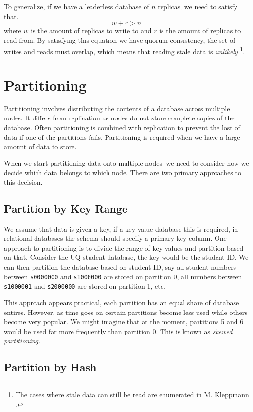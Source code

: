 To generalize, if we have a leaderless database of $n$ replicas,
we need to satisfy that,
$$
w + r > n
$$
where $w$ is the amount of replicas to write to and $r$ is the amount of replicas to read from.
By satisfying this equation we have quorum consistency,
the set of writes and reads must overlap,
which means that reading stale data is \textsl{unlikely}%
\footnote{The cases where stale data can still be read are enumerated in M. Kleppmann \cite{data-intensive}.}.

\section{Partitioning}

Partitioning involves distributing the contents of a database across multiple nodes.
It differs from replication as nodes do not store complete copies of the database.
Often partitioning is combined with replication to prevent the lost of data if one of the partitions fails.
Partitioning is required when we have a large amount of data to store.

When we start partitioning data onto multiple nodes,
we need to consider how we decide which data belongs to which node.
There are two primary approaches to this decision.

\subsection*{Partition by Key Range}
We assume that data is given a key,
if a key-value database this is required,
in relational databases the schema should specify a primary key column.
One approach to partitioning is to divide the range of key values and partition based on that.
Consider the UQ student database,
the key would be the student ID.
We can then partition the database based on student ID,
say all student numbers between \texttt{s0000000} and \texttt{s1000000} are stored on partition 0,
all numbers between \texttt{s1000001} and \texttt{s2000000} are stored on partition 1, etc.

This approach appears practical,
each partition has an equal share of database entires.
However, as time goes on certain partitions become less used while others become very popular.
We might imagine that at the moment,
partitions 5 and 6 would be used far more frequently than partition 0.
This is known as \textsl{skewed partitioning}.

\subsection*{Partition by Hash}

